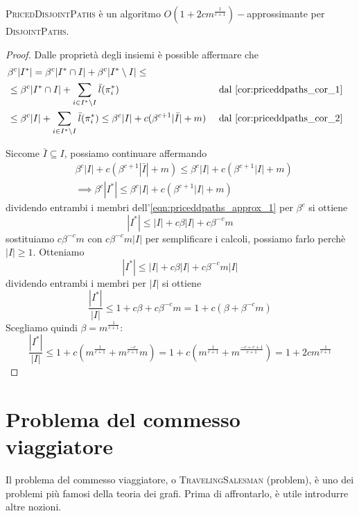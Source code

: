 \begin{theorem}\label{thm:priceddpaths_approx}
	\textsc{PricedDisjointPaths} è un algoritmo $O(1 + 2cm^{\frac{1}{c+1}})-$approssimante per
	\textsc{DisjointPaths}.
\end{theorem}
\begin{proof}
	Dalle proprietà degli insiemi è possible affermare che
	\begin{align*}
		 & \beta^c |I^*| = \beta^c |I^* \cap I| + \beta^c |I^* \setminus I| \leq                                                                                         \\
		 & \leq \beta^c|I^*\cap I| + \sum_{i \in I^* \setminus I} \bar{l}(\pi_i^*)                                        &  &
		\text{ dal \cref{cor:priceddpaths_cor_1}}                                                                                                                        \\
		 & \leq \beta^c |I| + \sum_{i \in I^* \setminus I} \bar{l}(\pi_i^*) \leq \beta^c |I| + c (\beta^{c+1}|\bar{I}|+m) &  & \text{ dal \cref{cor:priceddpaths_cor_2}}
	\end{align*}

	Siccome $\bar{I} \subseteq I$, possiamo continuare affermando
	\begin{align}
		 & \beta^c |I| + c (\beta^{c+1}|\bar{I}|+m) \leq \beta^c |I| + c (\beta^{c+1}|I|+m) \nonumber       \\
		 & \implies \beta^c |I^*| \leq \beta^c |I| + c (\beta^{c+1}|I|+m) \label{eqn:priceddpaths_approx_1}
	\end{align}
	dividendo entrambi i membri dell'\cref{eqn:priceddpaths_approx_1} per $\beta^c$ si ottiene
	$$
		|I^*| \leq |I| + c\beta|I| + c \beta^{-c}m
	$$
	sostituiamo $c \beta^{-c}m$ con $c \beta^{-c}m |I|$ per semplificare i calcoli, possiamo farlo 
	perchè $|I| \geq 1$. Otteniamo
	$$
		|I^*| \leq |I| + c\beta|I| + c \beta^{-c}m|I|
	$$
	dividendo entrambi i membri per $|I|$ si ottiene
	$$
		\frac{|I^*|}{|I|} \leq 1 + c\beta + c\beta^{-c}m = 1 + c(\beta + \beta^{-c}m)
	$$
	Scegliamo quindi $\beta=m^{\frac{1}{c+1}}$:
	$$
		\frac{|I^*|}{|I|} \leq 1 + c (m^{\frac{1}{c+1}} + m^{\frac{-c}{c+1}}m)
		= 1 + c (m^{\frac{1}{c+1}} + m^{\frac{-c + c + 1}{c+1}})
		= 1 + 2 c m^{\frac{1}{c+1}}
	$$
\end{proof}

\section{Problema del commesso viaggiatore}
Il problema del commesso viaggiatore, o \textsc{TravelingSalesman} (problem), è uno
dei problemi più famosi della teoria dei grafi. Prima di affrontarlo, è utile
introdurre altre nozioni.

